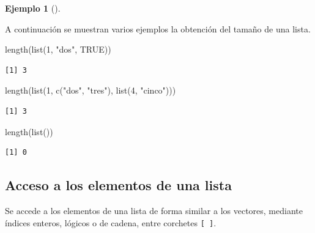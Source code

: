 \documentclass[
  a4paper,
]{scrreport}
\newenvironment{Shaded}{\begin{snugshade}}{\end{snugshade}}
\newcommand{\ConstantTok}[1]{\textcolor[rgb]{0.56,0.35,0.01}{#1}}
\newcommand{\DecValTok}[1]{\textcolor[rgb]{0.68,0.00,0.00}{#1}}
\newcommand{\FunctionTok}[1]{\textcolor[rgb]{0.28,0.35,0.67}{#1}}
\newcommand{\NormalTok}[1]{\textcolor[rgb]{0.00,0.23,0.31}{#1}}
\newcommand{\StringTok}[1]{\textcolor[rgb]{0.13,0.47,0.30}{#1}}
\theoremstyle{definition}
\newtheorem{example}{Ejemplo}[chapter]
\theoremstyle{definition}
\theoremstyle{remark}
\begin{document}
\leavevmode{}%
\begin{example}[]\label{exm-tamaño-lista}

A continuación se muestran varios ejemplos la obtención del tamaño de
una lista.

\begin{Shaded}
\begin{Highlighting}[]
\FunctionTok{length}\NormalTok{(}\FunctionTok{list}\NormalTok{(}\DecValTok{1}\NormalTok{, }\StringTok{"dos"}\NormalTok{, }\ConstantTok{TRUE}\NormalTok{))}
\end{Highlighting}
\end{Shaded}

\begin{verbatim}
[1] 3
\end{verbatim}

\begin{Shaded}
\begin{Highlighting}[]
\FunctionTok{length}\NormalTok{(}\FunctionTok{list}\NormalTok{(}\DecValTok{1}\NormalTok{, }\FunctionTok{c}\NormalTok{(}\StringTok{"dos"}\NormalTok{, }\StringTok{"tres"}\NormalTok{), }\FunctionTok{list}\NormalTok{(}\DecValTok{4}\NormalTok{, }\StringTok{"cinco"}\NormalTok{)))}
\end{Highlighting}
\end{Shaded}

\begin{verbatim}
[1] 3
\end{verbatim}

\begin{Shaded}
\begin{Highlighting}[]
\FunctionTok{length}\NormalTok{(}\FunctionTok{list}\NormalTok{())}
\end{Highlighting}
\end{Shaded}

\begin{verbatim}
[1] 0
\end{verbatim}

\end{example}

\hypertarget{acceso-a-los-elementos-de-una-lista}{%
\subsection{Acceso a los elementos de una
lista}\label{acceso-a-los-elementos-de-una-lista}}

Se accede a los elementos de una lista de forma similar a los vectores,
mediante índices enteros, lógicos o de cadena, entre corchetes
\texttt{{[}\ {]}}.
\end{document}
